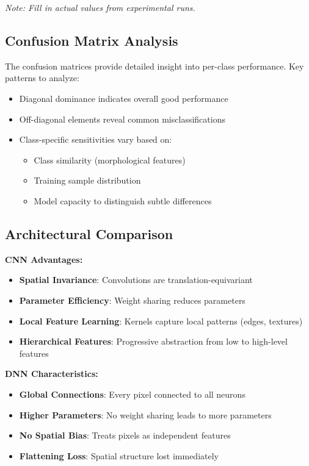 \documentclass[runningheads]{llncs}
\begin{document}
\textit{Note: Fill in actual values from experimental runs.}

\subsection{Confusion Matrix Analysis}

The confusion matrices provide detailed insight into per-class performance. Key patterns to analyze:

\begin{itemize}
    \item Diagonal dominance indicates overall good performance
    \item Off-diagonal elements reveal common misclassifications
    \item Class-specific sensitivities vary based on:
    \begin{itemize}
        \item Class similarity (morphological features)
        \item Training sample distribution
        \item Model capacity to distinguish subtle differences
    \end{itemize}
\end{itemize}

\subsection{Architectural Comparison}

\textbf{CNN Advantages:}
\begin{itemize}
    \item \textbf{Spatial Invariance}: Convolutions are translation-equivariant
    \item \textbf{Parameter Efficiency}: Weight sharing reduces parameters
    \item \textbf{Local Feature Learning}: Kernels capture local patterns (edges, textures)
    \item \textbf{Hierarchical Features}: Progressive abstraction from low to high-level features
\end{itemize}

\textbf{DNN Characteristics:}
\begin{itemize}
    \item \textbf{Global Connections}: Every pixel connected to all neurons
    \item \textbf{Higher Parameters}: No weight sharing leads to more parameters
    \item \textbf{No Spatial Bias}: Treats pixels as independent features
    \item \textbf{Flattening Loss}: Spatial structure lost immediately
\end{itemize}
\end{document}

